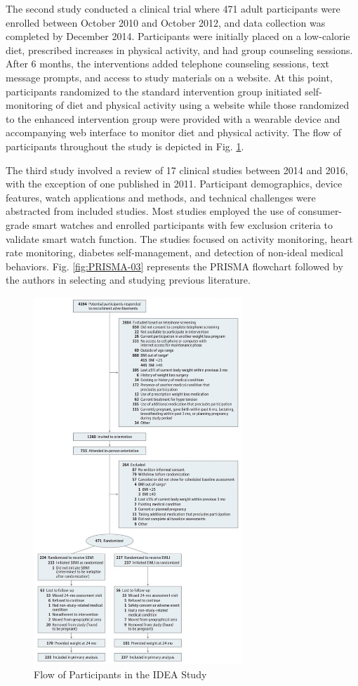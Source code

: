 The second study conducted a clinical trial where 471 adult participants were enrolled between October 2010 and October 2012, and data collection was completed by December 2014. Participants were initially placed on a low-calorie diet, prescribed increases in physical activity, and had group counseling sessions. After 6 months, the interventions added telephone counseling sessions, text message prompts, and access to study materials on a website. At this point, participants randomized to the standard intervention group initiated self-monitoring of diet and physical activity using a website while those randomized to the enhanced intervention group were provided with a wearable device and accompanying web interface to monitor diet and physical activity. The flow of participants throughout the study is depicted in Fig. \ref{fig:ParticipantFlow}.

The third study involved a review of 17 clinical studies between 2014 and 2016, with the exception of one published in 2011. Participant demographics, device features, watch applications and methods, and technical challenges were abstracted from included studies. Most studies employed the use of consumer-grade smart watches and enrolled participants with few exclusion criteria to validate smart watch function. The studies focused on activity monitoring, heart rate monitoring, diabetes self-management, and detection of non-ideal medical behaviors. Fig. \ref{fig:PRISMA-03} represents the PRISMA flowchart followed by the authors in selecting and studying previous literature.
\begin{figure}[!htb]
    \centering
    \includegraphics[width=0.7\textwidth]{assets/ParticipantFlow-Case02.jpg}
    \caption{Flow of Participants in the IDEA Study \cite{ref02}}
    \label{fig:ParticipantFlow}
\end{figure}

